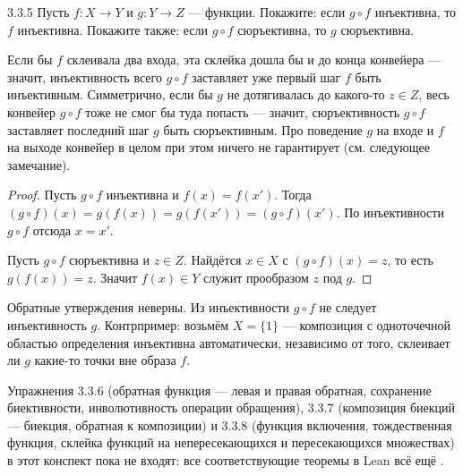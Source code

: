 \begin{exercise}{3.3.5}{}
Пусть $f:X\to Y$ и $g:Y\to Z$ — функции. Покажите: если $g\circ f$ инъективна, то $f$
инъективна. Покажите также: если $g\circ f$ сюръективна, то $g$ сюръективна.
\end{exercise}

\begin{intuition}
Если бы $f$ склеивала два входа, эта склейка дошла бы и до конца конвейера — значит,
инъективность всего $g\circ f$ заставляет уже первый шаг $f$ быть инъективным. Симметрично,
если бы $g$ не дотягивалась до какого-то $z\in Z$, весь конвейер $g\circ f$ тоже не смог бы
туда попасть — значит, сюръективность $g\circ f$ заставляет последний шаг $g$ быть
сюръективным. Про поведение $g$ на входе и $f$ на выходе конвейер в целом при этом ничего не
гарантирует (см. следующее замечание).
\end{intuition}

\begin{proof}
 Пусть $g\circ f$ инъективна и $f(x)=f(x')$. Тогда
$(g\circ f)(x)=g(f(x))=g(f(x'))=(g\circ f)(x')$. По инъективности $g\circ f$ отсюда $x=x'$.

 Пусть $g\circ f$ сюръективна и $z\in Z$. Найдётся $x\in X$ с
$(g\circ f)(x)=z$, то есть $g(f(x))=z$. Значит $f(x)\in Y$ служит прообразом $z$ под $g$.
\end{proof}

\begin{remark}
Обратные утверждения неверны. Из инъективности $g\circ f$ не следует инъективность $g$.
Контрпример: возьмём $X=\{1\}$ — композиция с одноточечной областью определения инъективна
автоматически, независимо от того, склеивает ли $g$ какие-то точки вне образа $f$.
\end{remark}

\begin{remark}
Упражнения 3.3.6 (обратная функция — левая и правая обратная, сохранение биективности,
инволютивность операции обращения), 3.3.7 (композиция биекций — биекция, обратная к
композиции) и 3.3.8 (функция включения, тождественная функция, склейка функций на
непересекающихся и пересекающихся множествах) в этот конспект пока не входят: все
соответствующие теоремы в Lean всё ещё .
\end{remark}
